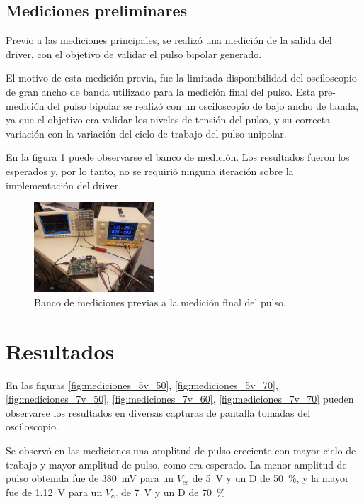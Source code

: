 \subsection{Mediciones preliminares}

Previo a las mediciones principales, se realizó una medición de la salida del driver,
con el objetivo de validar el pulso bipolar generado.

El motivo de esta medición previa, fue la limitada disponibilidad del
osciloscopio de gran ancho de banda utilizado para la medición final del pulso.
Esta pre-medición del pulso bipolar se realizó con un osciloscopio de bajo ancho
de banda, ya que el objetivo era validar los niveles de tensión del pulso, y su
correcta variación con la variación del ciclo de trabajo del pulso unipolar.

En la figura \ref{fig:banco_pre_mediciones} puede observarse el banco de
medición. Los resultados fueron los esperados y, por lo tanto, no se requirió
ninguna iteración sobre la implementación del driver.

\begin{figure}
  \centering
    \includegraphics[width=0.4\textwidth]{images/banco_pre_mediciones.jpg}
    \caption{Banco de mediciones previas a la medición final del pulso.}
    \label{fig:banco_pre_mediciones}
\end{figure}

\section{Resultados}

En las figuras \ref{fig:mediciones_5v_50}, \ref{fig:mediciones_5v_70},
\ref{fig:mediciones_7v_50}, \ref{fig:mediciones_7v_60},
\ref{fig:mediciones_7v_70} pueden observarse los resultados en diversas capturas de pantalla
tomadas del osciloscopio.

Se observó en las mediciones una amplitud de pulso creciente con mayor ciclo de
trabajo y mayor amplitud de pulso, como era esperado. La menor amplitud de pulso
obtenida fue de \qty{380}{\milli\volt} para un $V_{cc}$ de \qty{5}{\volt} y un D
de \qty{50}{\percent}, y la mayor fue de \qty{1.12}{\volt} para un $V_{cc}$
de \qty{7}{\volt} y un D de \qty{70}{\percent}


